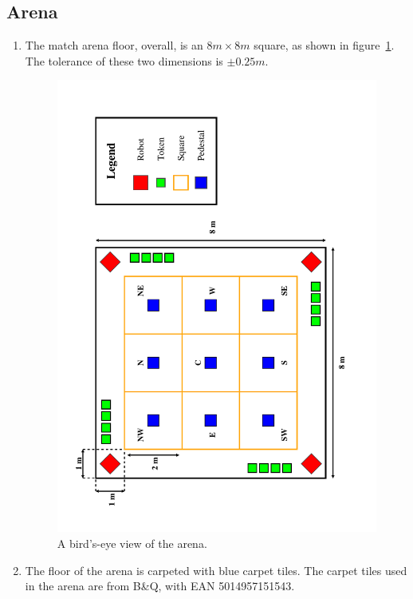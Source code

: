\subsection{Arena}
\label{sub:arena}
\begin{enumerate}
\item The match arena floor, overall, is an $8m \times 8m$ square, as shown in figure~\ref{fig:arena-dim}.
      The tolerance of these two dimensions is $\pm0.25m$.

\begin{figure}
  \centering
  \includegraphics[width=\textwidth]{./images/arena.pdf}
  \caption{\label{fig:arena-dim}A bird's-eye view of the arena.}
\end{figure}

\item The floor of the arena is carpeted with blue carpet tiles.
      The carpet tiles used in the arena are from B\&Q, with EAN 5014957151543.


\end{enumerate}

